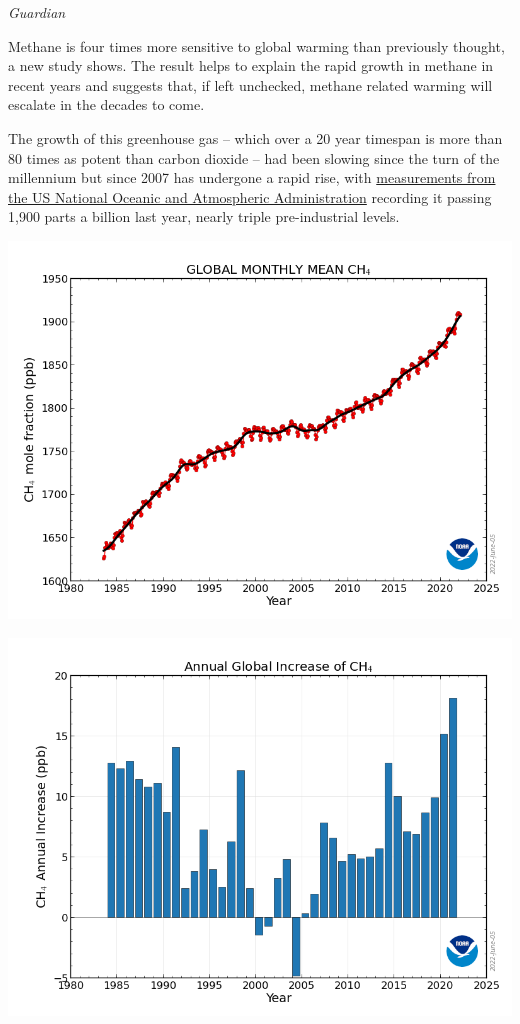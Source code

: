 \documentclass[
]{book}
\begin{document}
\emph{Guardian}

Methane is four times more sensitive to global warming than previously thought, a new study shows. The result helps to explain the rapid growth in methane in recent years and suggests that, if left unchecked, methane related warming will escalate in the decades to come.

The growth of this greenhouse gas -- which over a 20 year timespan is more than 80 times as potent than carbon dioxide -- had been slowing since the turn of the millennium but since 2007 has undergone a rapid rise, with \href{https://gml.noaa.gov/ccgg/trends_ch4/\#:~:text=Global\%20CH4\%20Monthly\%20Means\&text=The\%20Global\%20Monitoring\%20Division\%20of,et\%20al.,\%201994}{measurements from the US National Oceanic and Atmospheric Administration} recording it passing 1,900 parts a billion last year, nearly triple pre-industrial levels.

\includegraphics{fig/ch4_trend_all_gl.png}

\includegraphics{fig/ch4_gr_gl.png}
\end{document}

